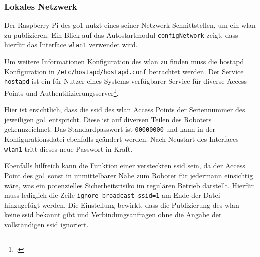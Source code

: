 \subsubsection{Lokales Netzwerk}
\label{subsubsec:lokales-netzwerk}

Der Raspberry Pi des \gls{go1} nutzt eines seiner Netzwerk-Schnittstellen, um ein \gls{wlan} zu publizieren.
Ein Blick auf das Autostartmodul \texttt{configNetwork} zeigt, dass hierfür das Interface \texttt{wlan1} verwendet wird.



\noindent Um weitere Informationen Konfiguration des \gls{wlan} zu finden muss die \gls{hostapd} Konfiguration in
\texttt{/etc/\allowbreak hostapd/\allowbreak hostapd\allowbreak .conf} betrachtet werden.
Der Service \texttt{\gls{hostapd}} ist ein für Nutzer eines Systems verfügbarer Service für diverse Access Points und
Authentifizierungsserver\footcite{hostapd-doc}.



\noindent Hier ist ersichtlich, dass die \gls{ssid} des \gls{wlan} Access Points der Seriennummer des jeweiligen \gls{go1} entspricht.
Diese ist auf diversen Teilen des Roboters gekennzeichnet.
Das Standardpasswort ist \texttt{00000000} und kann in der Konfigurationsdatei ebenfalls geändert werden.
Nach Neustart des Interfaces \texttt{wlan1} tritt dieses neue Passwort in Kraft.

Ebenfalls hilfreich kann die Funktion einer versteckten \gls{ssid} sein, da der Access Point des \gls{go1} sonst in unmittelbarer
Nähe zum Roboter für jedermann einsichtig wäre, was ein potenzielles Sicherheitsrisiko im regulären Betrieb darstellt.
Hierfür muss lediglich die Zeile \texttt{ignore\_\allowbreak broadcast\_\allowbreak ssid=1} am Ende der Datei hinzugefügt werden.
Die Einstellung bewirkt, dass die Publizierung des \gls{wlan} keine \gls{ssid} bekannt gibt und Verbindungsanfragen ohne die Angabe der
vollständigen \gls{ssid} ignoriert.


